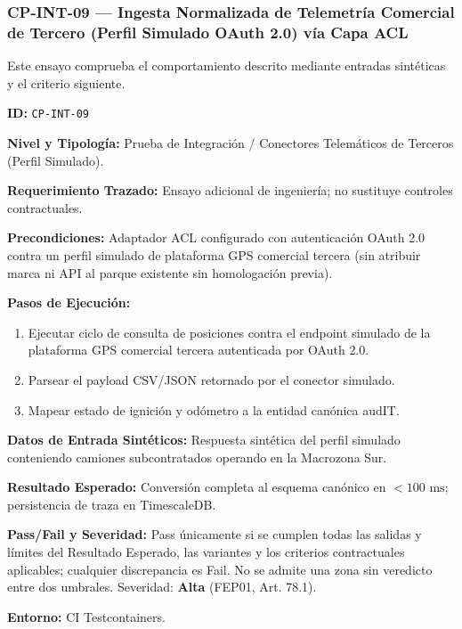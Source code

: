 \subsubsection*{CP-INT-09 — Ingesta Normalizada de Telemetría Comercial de Tercero (Perfil Simulado OAuth 2.0) vía Capa ACL}\label{sec:9-cp-int-09}
Este ensayo comprueba el comportamiento descrito mediante entradas sintéticas y el criterio siguiente.

\par\noindent\textbf{ID:} \texttt{C\allowbreak{}P\allowbreak{}-\allowbreak{}I\allowbreak{}N\allowbreak{}T\allowbreak{}-\allowbreak{}0\allowbreak{}9\allowbreak{}}\par
\par\noindent\textbf{Nivel y Tipología:} Prueba de Integración / Conectores Telemáticos de Terceros (Perfil Simulado).\par
\par\noindent\textbf{Requerimiento Trazado:} Ensayo adicional de ingeniería; no sustituye controles contractuales.\par
\par\noindent\textbf{Precondiciones:} Adaptador ACL configurado con autenticación OAuth 2.0 contra un perfil simulado de plataforma GPS comercial tercera (sin atribuir marca ni API al parque existente sin homologación previa).\par
\par\noindent\textbf{Pasos de Ejecución:} \par
\begin{enumerate}
\item Ejecutar ciclo de consulta de posiciones contra el endpoint simulado de la plataforma GPS comercial tercera autenticada por OAuth 2.0.
\item Parsear el payload CSV/JSON retornado por el conector simulado.
\item Mapear estado de ignición y odómetro a la entidad canónica audIT.
\end{enumerate}
\par\noindent\textbf{Datos de Entrada Sintéticos:} Respuesta sintética del perfil simulado conteniendo camiones subcontratados operando en la Macrozona Sur.\par
\par\noindent\textbf{Resultado Esperado:} Conversión completa al esquema canónico en \(< 100\text{ ms}\); persistencia de traza en TimescaleDB.\par
\par\noindent\textbf{Pass/Fail y Severidad:} Pass únicamente si se cumplen todas las salidas y límites del Resultado Esperado, las variantes y los criterios contractuales aplicables; cualquier discrepancia es Fail. No se admite una zona sin veredicto entre dos umbrales. Severidad: \textbf{Alta} (FEP01, Art. 78.1).\par
\par\noindent\textbf{Entorno:} CI Testcontainers.\par






